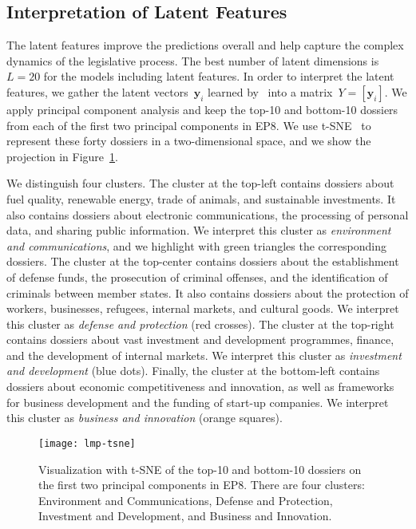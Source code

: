 \subsection{Interpretation of Latent Features}

The latent features improve the predictions overall and help capture the complex dynamics of the legislative process.
The best number of latent dimensions is~$L = 20$  for the models including latent features.
In order to interpret the latent features, we gather the latent vectors~$\bm{y}_i$ learned by \ into a matrix~$Y = [ \bm{y}_i ]$.
We apply principal component analysis and keep the top-10 and bottom-10 dossiers from each of the first two principal components in EP8.
We use t-SNE~\cite{maaten2008visualizing} to represent these forty dossiers in a two-dimensional space, and we show the projection in Figure~\ref{lmp:fig:tsne}.

We distinguish four clusters.
The cluster at the top-left contains dossiers about fuel quality, renewable energy, trade of animals, and sustainable investments.
It also contains dossiers about electronic communications, the processing of personal data, and sharing public information.
We interpret this cluster as \textit{environment and communications}, and we highlight with green triangles the corresponding dossiers.
The cluster at the top-center contains dossiers about the establishment of defense funds, the prosecution of criminal offenses, and the identification of criminals between member states.
It also contains dossiers about the protection of workers, businesses, refugees, internal markets, and cultural goods.
We interpret this cluster as \textit{defense and protection} (red crosses).
The cluster at the top-right contains dossiers about vast investment and development programmes, finance, and the development of internal markets.
We interpret this cluster as \textit{investment and development} (blue dots).
Finally, the cluster at the bottom-left contains dossiers about economic competitiveness and innovation, as well as frameworks for business development and the funding of start-up companies.
We interpret this cluster as \textit{business and innovation} (orange squares).

\begin{figure}
	\centering
	\texttt{[image: lmp-tsne]}
	\caption{Visualization with t-SNE of the top-10 and bottom-10 dossiers on the first two principal components in EP8.
		There are four clusters:
		Environment and Communications, Defense and Protection, Investment and Development, and Business and Innovation.
	}
	\label{lmp:fig:tsne}
\end{figure}

